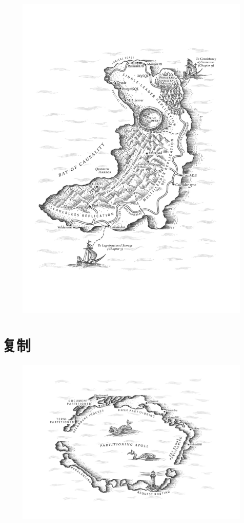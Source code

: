 \documentclass{book}
\begin{document}
\newpage
\begin{figure}
  \centering
  \includegraphics[width=\textwidth]{img/ch5.png}
  \label{fig:ch5}
\end{figure}

\chapter{复制}
\label{ch:ch5}

\newpage
\begin{figure}
  \centering
  \includegraphics[width=\textwidth]{img/ch6.png}
  \label{fig:ch6}
\end{figure}
\end{document}
